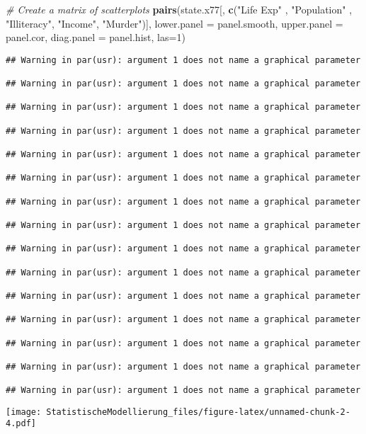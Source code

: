 \documentclass[
]{article}
\newenvironment{Shaded}{\begin{snugshade}}{\end{snugshade}}
\newcommand{\AttributeTok}[1]{\textcolor[rgb]{0.13,0.29,0.53}{#1}}
\newcommand{\CommentTok}[1]{\textcolor[rgb]{0.56,0.35,0.01}{\textit{#1}}}
\newcommand{\DecValTok}[1]{\textcolor[rgb]{0.00,0.00,0.81}{#1}}
\newcommand{\FunctionTok}[1]{\textcolor[rgb]{0.13,0.29,0.53}{\textbf{#1}}}
\newcommand{\NormalTok}[1]{#1}
\newcommand{\StringTok}[1]{\textcolor[rgb]{0.31,0.60,0.02}{#1}}
\begin{document}
\begin{Shaded}
\begin{Highlighting}[]
\CommentTok{\# Create a matrix of scatterplots}
\FunctionTok{pairs}\NormalTok{(state.x77[, }\FunctionTok{c}\NormalTok{(}\StringTok{"Life Exp"}\NormalTok{ , }\StringTok{"Population"}\NormalTok{ , }\StringTok{"Illiteracy"}\NormalTok{, }\StringTok{"Income"}\NormalTok{, }\StringTok{"Murder"}\NormalTok{)], }
      \AttributeTok{lower.panel =}\NormalTok{ panel.smooth, }
      \AttributeTok{upper.panel =}\NormalTok{ panel.cor, }
      \AttributeTok{diag.panel =}\NormalTok{ panel.hist, }
      \AttributeTok{las=}\DecValTok{1}\NormalTok{)}
\end{Highlighting}
\end{Shaded}

\begin{verbatim}
## Warning in par(usr): argument 1 does not name a graphical parameter

## Warning in par(usr): argument 1 does not name a graphical parameter

## Warning in par(usr): argument 1 does not name a graphical parameter

## Warning in par(usr): argument 1 does not name a graphical parameter

## Warning in par(usr): argument 1 does not name a graphical parameter

## Warning in par(usr): argument 1 does not name a graphical parameter

## Warning in par(usr): argument 1 does not name a graphical parameter

## Warning in par(usr): argument 1 does not name a graphical parameter

## Warning in par(usr): argument 1 does not name a graphical parameter

## Warning in par(usr): argument 1 does not name a graphical parameter

## Warning in par(usr): argument 1 does not name a graphical parameter

## Warning in par(usr): argument 1 does not name a graphical parameter

## Warning in par(usr): argument 1 does not name a graphical parameter

## Warning in par(usr): argument 1 does not name a graphical parameter

## Warning in par(usr): argument 1 does not name a graphical parameter
\end{verbatim}

\texttt{[image: StatistischeModellierung\_files/figure-latex/unnamed-chunk-2-4.pdf]}
\end{document}
